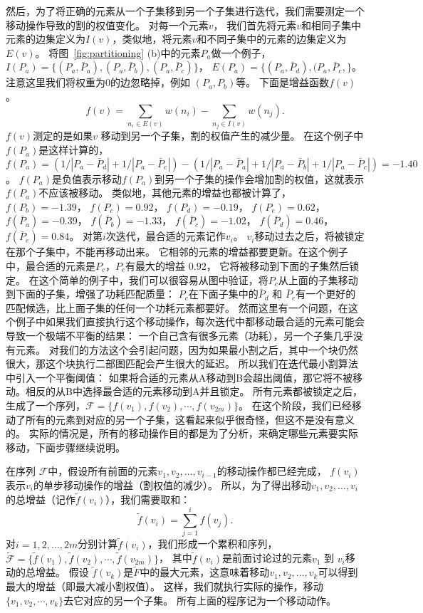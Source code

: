   然后，为了将正确的元素从一个子集移到另一个子集进行迭代，我们需要测定一个移动操作导致的割的权值变化。
  对每一个元素$v$， 我们首先将元素$v$和相同子集中元素的边集定义为$I(v)$，类似地，将元素$v$和不同子集中的元素的边集定义为$E(v)$。
  将图~\ref{fig:partitioning} (b)中的元素$P_a$做一个例子，
  $I(P_a) = \{(P_a,
    \bar{P}_a), (P_a, \bar{P}_b), (P_a, \bar{P}_c)\}$， $E(P_a) =
  \{(P_a, \bar{P}_d), (P_a, \bar{P}_e, \}$。
  注意这里我们将权重为$0$的边忽略掉，例如 $(P_a, P_b)$等。
  下面是增益函数$f(v)$。
  \begin{equation}
  f(v) = \sum_{n_i \in E(v)}{w(n_i )} - \sum_{n_j \in I(v)}{w(n_j )}.
  \end{equation}
  $f(v)$测定的是如果$v$ 移动到另一个子集，割的权值产生的减少量。
  在这个例子中$f(P_a)$是这样计算的， $f(P_a) =
  (1/|P_a-\bar{P}_d|+1/|P_a-\bar{P}_e|)-(1/|P_a-\bar{P}_a|+1/|P_a-\bar{P}_b|+1/|P_a-\bar{P}_c|)=-1.40$。
  $f(P_a)$是负值表示移动$f(P_a)$到另一个子集的操作会增加割的权值，这就表示$f(P_a)$不应该被移动。
  类似地，其他元素的增益也都被计算了， $f(P_b)=-1.39$， $f(P_c) = 0.92$， $f(P_d) = -0.19$，
  $f(P_e)=0.62$， $f(\bar{P}_a) = -0.39$， $f(\bar{P}_b)=-1.33$，
  $f(\bar{P}_c)=-1.02$， $f(\bar{P}_d) = 0.46$， $f(\bar{P}_e) = 0.84$。
  对第$i$次迭代，最合适的元素记作$v_i$。 $v_i$移动过去之后，将被锁定在那个子集中，不能再移动出来。
  它相邻的元素的增益都要更新。在这个例子中，最合适的元素是$P_c$，$P_c$有最大的增益 $0.92$，
  它将被移动到下面的子集然后锁定。
  在这个简单的例子中，我们可以很容易从图中验证，将$P_c$从上面的子集移动到下面的子集，增强了功耗匹配质量：
$P_c$在下面子集中的$\bar{P}_d$ 和 $\bar{P}_e$有一个更好的匹配候选，比上面子集的任何一个功耗元素都要好。
然而这里有一个问题，在这个例子中如果我们直接执行这个移动操作，每次迭代中都移动最合适的元素可能会导致一个极端不平衡的结果：
一个自己含有很多元素（功耗），另一个子集几乎没有元素。
对我们的方法这个会引起问题，因为如果最小割之后，其中一个块仍然很大，那这个块执行二部图匹配会产生很大的延迟。
所以我们在迭代最小割算法中引入一个平衡阈值：
如果将合适的元素从A移动到B会超出阈值，那它将不被移动。相反的从B中选择最合适的元素移动到A并且锁定。
所有元素都被锁定之后，生成了一个序列，$\mathcal{F} = \{f(v_1), f(v_2), \cdots, f(v_{2m})\}$。
在这个阶段，我们已经移动了所有的元素到对应的另一个子集，这看起来似乎很奇怪，但这不是没有意义的。
实际的情况是，所有的移动操作目的都是为了分析，来确定哪些元素要实际移动，下面步骤继续说明。

在序列 $\mathcal{F}$中，假设所有前面的元素$v_1, v_2, \ldots, v_{i-1}$的移动操作都已经完成， $f(v_i)$表示$v_i$的单步移动操作的增益（割权值的减少）。
所以，为了得出移动$v_1, v_2, \ldots, v_i$的总增益（记作$\tilde{f}(v_i)$），我们需要取和：
\begin{equation}
\tilde{f}(v_i) = \sum\limits_{j=1}^i f(v_j).
\end{equation}
对$i=1,2, \ldots, 2m$分别计算$\tilde{f}(v_i)$，我们形成一个累积和序列，
$\tilde{\mathcal{F}} = \{\tilde{f}(v_1), \tilde{f}(v_2), \cdots,
\tilde{f}(v_{2m})\}$，
其中$\tilde{f}(v_i)$是前面讨论过的元素$v_1$ 到 $v_i$移动的总增益。
假设 $\tilde{f}(v_k)$是$\tilde{F}$中的最大元素，这意味着移动$v_1, v_2, \ldots, v_k$可以得到最大的增益（即最大减小割权值）。
这样，我们就执行实际的操作，移动$\{v_1, v_2, \cdots, v_k\}$去它对应的另一个子集。
所有上面的程序记为一个移动动作。

